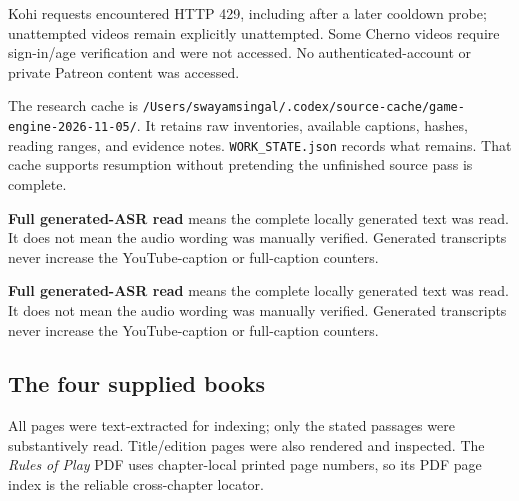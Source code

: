 Kohi requests encountered HTTP 429, including after a later cooldown probe; unattempted videos remain explicitly unattempted. Some Cherno videos require sign-in/age verification and were not accessed. No authenticated-account or private Patreon content was accessed.

The research cache is \texttt{/Users/swayamsingal/.codex/source-cache/game-engine-2026-11-05/}. It retains raw inventories, available captions, hashes, reading ranges, and evidence notes. \texttt{WORK\_STATE.json} records what remains. That cache supports resumption without pretending the unfinished source pass is complete.

\textbf{Full generated-ASR read} means the complete locally generated text was read. It does not mean the audio wording was manually verified. Generated transcripts never increase the YouTube-caption or full-caption counters.

\textbf{Full generated-ASR read} means the complete locally generated text was read. It does not mean the audio wording was manually verified. Generated transcripts never increase the YouTube-caption or full-caption counters.

\subsection{The four supplied books}\label{the-four-supplied-books}

All pages were text-extracted for indexing; only the stated passages were substantively read. Title/edition pages were also rendered and inspected. The \emph{Rules of Play} PDF uses chapter-local printed page numbers, so its PDF page index is the reliable cross-chapter locator.

